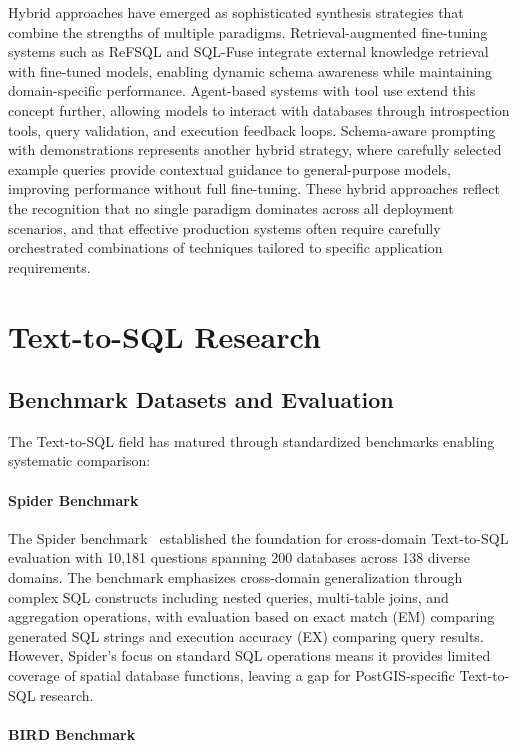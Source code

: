 Hybrid approaches have emerged as sophisticated synthesis strategies that combine the strengths of multiple paradigms. Retrieval-augmented fine-tuning systems such as ReFSQL and SQL-Fuse integrate external knowledge retrieval with fine-tuned models, enabling dynamic schema awareness while maintaining domain-specific performance. Agent-based systems with tool use extend this concept further, allowing models to interact with databases through introspection tools, query validation, and execution feedback loops. Schema-aware prompting with demonstrations represents another hybrid strategy, where carefully selected example queries provide contextual guidance to general-purpose models, improving performance without full fine-tuning. These hybrid approaches reflect the recognition that no single paradigm dominates across all deployment scenarios, and that effective production systems often require carefully orchestrated combinations of techniques tailored to specific application requirements.

\section{Text-to-SQL Research}

\subsection{Benchmark Datasets and Evaluation}

The Text-to-SQL field has matured through standardized benchmarks enabling systematic comparison:

\paragraph{Spider Benchmark}

The Spider benchmark~\cite{yu2018spider} established the foundation for cross-domain Text-to-SQL evaluation with 10,181 questions spanning 200 databases across 138 diverse domains. The benchmark emphasizes cross-domain generalization through complex SQL constructs including nested queries, multi-table joins, and aggregation operations, with evaluation based on exact match (EM) comparing generated SQL strings and execution accuracy (EX) comparing query results. However, Spider's focus on standard SQL operations means it provides limited coverage of spatial database functions, leaving a gap for PostGIS-specific Text-to-SQL research.

\paragraph{BIRD Benchmark}

